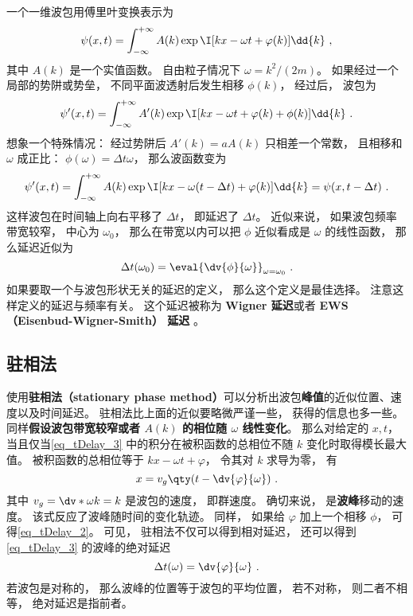 
\begin{issues}
\issueDraft
\end{issues}

一个一维波包用傅里叶变换表示为
\begin{equation}\label{eq_tDelay_3}
\psi(x, t) = \int_{-\infty}^{+\infty} A(k) \exp \I[ kx - \omega t + \varphi(k)] \dd{k}~,
\end{equation}
其中 $A(k)$ 是一个实值函数。 自由粒子情况下 $\omega = k^2/(2m)$。 如果经过一个局部的势阱或势垒， 不同平面波透射后发生相移 $\phi(k)$， 经过后， 波包为
\begin{equation}\label{eq_tDelay_1}
\psi'(x, t) = \int_{-\infty}^{+\infty} A'(k) \exp \I[kx - \omega t + \varphi(k) + \phi(k)] \dd{k}~.
\end{equation}
想象一个特殊情况： 经过势阱后 $A'(k) = a A(k)$ 只相差一个常数， 且相移和 $\omega$ 成正比： $\phi(\omega) = \Delta t \omega$， 那么波函数变为
\begin{equation}
\psi'(x, t) = \int_{-\infty}^{+\infty} A(k) \exp \I[kx - \omega (t - \Delta t) + \varphi(k)] \dd{k}
= \psi(x, t - \Delta t)~.
\end{equation}
这样波包在时间轴上向右平移了 $\Delta t$， 即延迟了 $\Delta t$。 近似来说， 如果波包频率带宽较窄， 中心为 $\omega_0$， 那么在带宽以内可以把 $\phi$ 近似看成是 $\omega$ 的线性函数， 那么延迟近似为
\begin{equation}\label{eq_tDelay_2}
\Delta t(\omega_0) = \eval{\dv{\phi}{\omega}}_{\omega = \omega_0}~.
\end{equation}
如果要取一个与波包形状无关的延迟的定义， 那么这个定义是最佳选择。 注意这样定义的延迟与频率有关。 这个延迟被称为 \textbf{Wigner 延迟}或者 \textbf{EWS （Eisenbud-Wigner-Smith） 延迟} 。

\subsection{驻相法}
使用\textbf{驻相法（stationary phase method）}可以分析出波包\textbf{峰值}的近似位置、速度以及时间延迟。 驻相法比上面的近似要略微严谨一些， 获得的信息也多一些。 同样\textbf{假设波包带宽较窄或者 $A(k)$ 的相位随 $\omega$ 线性变化}。 那么对给定的 $x, t$， 当且仅当\autoref{eq_tDelay_3} 中的积分在被积函数的总相位不随 $k$ 变化时取得模长最大值。 被积函数的总相位等于 $kx - \omega t + \varphi$， 令其对 $k$ 求导为零， 有
\begin{equation}\label{eq_tDelay_5}
x = v_g \qty(t - \dv{\varphi}{\omega})~.
\end{equation}
其中 $v_g = \dv*{\omega}{k} = k$ 是波包的速度， 即群速度。 确切来说， 是\textbf{波峰}移动的速度。 该式反应了波峰随时间的变化轨迹。 同样， 如果给 $\varphi$ 加上一个相移 $\phi$， 可得\autoref{eq_tDelay_2}。 可见， 驻相法不仅可以得到相对延迟， 还可以得到\autoref{eq_tDelay_3} 的波峰的绝对延迟
\begin{equation}\label{eq_tDelay_4}
\Delta t(\omega) = \dv{\varphi}{\omega}~.
\end{equation}
若波包是对称的， 那么波峰的位置等于波包的平均位置， 若不对称， 则二者不相等， 绝对延迟是指前者。

